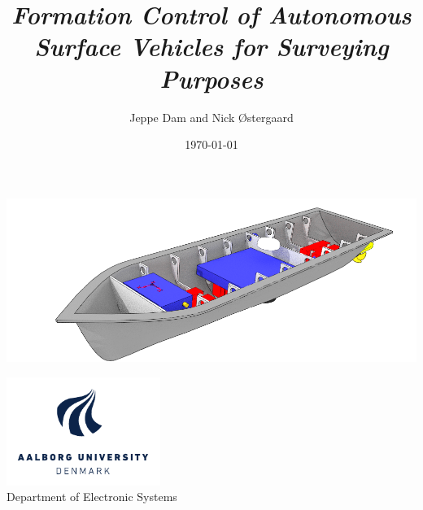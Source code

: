 \author{Jeppe Dam and Nick Østergaard}
\title{\textbf{\emph{Formation Control of Autonomous Surface Vehicles for Surveying Purposes}}}
\date{\today}
\maketitle
\thispagestyle{empty}
\vspace{3cm}
\begin{center}
	\includegraphics[width=15cm]{frontmatter/aauship}
\end{center}
\vfill
\begin{center}
	\includegraphics[width=5cm]{frontmatter/AAU_LOGO_CMYK_UK}\\
	Department of Electronic Systems
\end{center}
\clearpage
\restoregeometry

